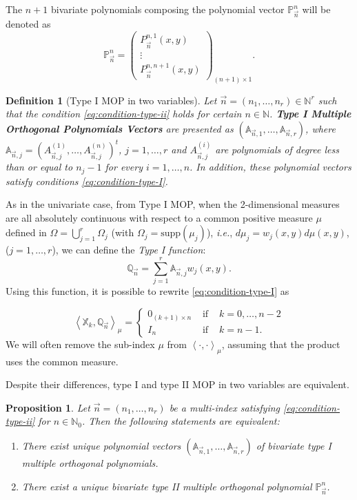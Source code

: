 \documentclass[12pt,a4]{article}
\theoremstyle{plain}
\newtheorem{proposition}[theorem]{Proposition}
\newtheorem{definition}[theorem]{Definition}
\newcommand{\N}[0]{\mathbb{N}}
\newcommand{\supp}[0]{\mathrm{supp}}
\newcommand{\prodesc}[2]{\left\langle #1 , #2 \right\rangle}
\begin{document}
The $n+1$ bivariate polynomials composing the polynomial vector $\mathbb P_{\vec n}^n$ will be denoted as
$$
\mathbb P_{\vec n}^n = 
\begin{pmatrix}
    P_{\vec n}^{n,1}(x,y) \\ \vdots \\ P_{\vec n}^{n,n+1}(x,y)
\end{pmatrix}_{(n+1)\times 1}.
$$

\begin{definition}[Type I MOP in two variables]
    Let $\vec n = (n_1, \dots, n_r)\in \N^r$ such that the condition \eqref{eq:condition-type-ii} holds for certain $n\in\N$. \textbf{Type I Multiple Orthogonal Polynomials Vectors} are presented as $(\mathbb A_{\vec n,1}, \dots, \mathbb A_{\vec n,r})$, where 
    $\mathbb A_{\vec n,j}=(A_{\vec n,j}^{(1)}, \dots, A_{\vec n,j}^{(n)})^t$, $j=1,\dots,r$ and $A_{\vec n,j}^{(i)}$ are polynomials of degree less than or equal to $n_j-1$ for every $i=1,\dots,n$. In addition, these polynomial vectors satisfy conditions \eqref{eq:condition-type-I}.     
\end{definition}

As in the univariate case, from Type I MOP, when the 2-dimensional measures are all absolutely continuous with respect to a common positive measure $\mu$ defined in $\Omega = \displaystyle\bigcup_{j=1}^r \Omega_j$ (with $\Omega_j=\supp(\mu_j)$), \textit{i.e.}, $d\mu_j = w_j(x,y)d\mu(x,y)$, ($j=1,\dots,r$), we can define the \textit{Type I function}:
\begin{equation}
    \label{eq:type-I-function-2-vars}
    \mathbb Q_{\vec n} = \sum_{j=1}^r \mathbb A_{\vec n,j}w_j(x,y).
\end{equation}
Using this function, it is possible to rewrite \eqref{eq:condition-type-I} as

\begin{equation}
    \prodesc{\mathbb X_k}{\mathbb Q_{\vec n}}_\mu = \left\{\begin{array}{ccl}
        0_{(k+1)\times n} &   \text{ if } & k=0,\dots,n-2 \\
        I_n & \text{ if } & k=n-1.
    \end{array}\right.     
\end{equation}
We will often remove the sub-index $\mu$ from $\prodesc{\cdot}{\cdot}_\mu$, assuming that the product uses the common measure.

Despite their differences, type I and type II MOP in two variables are equivalent.
\begin{proposition}
  \label{prop:existence}
  Let $\vec n = (n_1,\dots,n_r)$ be a multi-index satisfying \eqref{eq:condition-type-ii} for $n\in\N_0$. Then the following statements are equivalent:
  \begin{enumerate}
      \item There exist unique polynomial vectors $(\mathbb A_{\vec n,1}, \dots, \mathbb A_{\vec n,r})$ of bivariate type I multiple orthogonal polynomials.
      \item There exist a unique bivariate type II multiple orthogonal polynomial $\mathbb P_{\vec n}^n$.
  \end{enumerate}
\end{proposition}
\end{document}
